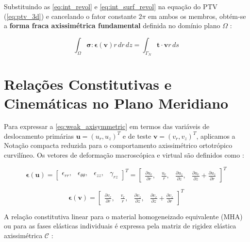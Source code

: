 Substituindo as \eqref{eq:int_revol} e \eqref{eq:int_surf_revol} na equação do PTV (\eqref{eq:ptv_3d}) e cancelando o fator constante $2 \pi$ em ambos os membros, obtém-se a \textbf{forma fraca axissimétrica fundamental} definida no domínio plano $\Omega$ \cite{logg2012automated}:

\begin{equation}
  \int_{\Omega} \mathbf{\sigma} : \mathbf{\epsilon}(\mathbf{v}) r \, d r \, d z = \int_{\Gamma_N} \mathbf{t} \cdot \mathbf{v} r \, d s
  \label{eq:weak_axisymmetric}
\end{equation}

\section{Relações Constitutivas e Cinemáticas no Plano Meridiano}

Para expressar a \eqref{eq:weak_axisymmetric} em termos das variáveis de deslocamento primárias $\mathbf{u} = (u_r, u_z)^T$ e de teste $\mathbf{v} = (v_r, v_z)^T$, aplicamos a Notação compacta reduzida para o comportamento axissimétrico ortotrópico curvilíneo. Os vetores de deformação macroscópica e virtual são definidos como \cite{logg2012automated}:

\begin{equation}
  \mathbf{\epsilon}(\mathbf{u}) = \begin{bmatrix} \epsilon_{rr}, & \epsilon_{\theta\theta}, & \epsilon_{zz}, & \gamma_{rz} \end{bmatrix}^T = \begin{bmatrix} \frac{\partial u_r}{\partial r}, & \frac{u_r}{r}, & \frac{\partial u_z}{\partial z}, & \frac{\partial u_r}{\partial z} + \frac{\partial u_z}{\partial r} \end{bmatrix}^T
  \label{eq:voigt_strain}
\end{equation}

\begin{equation}
  \mathbf{\epsilon}(\mathbf{v}) = \begin{bmatrix} \frac{\partial v_r}{\partial r}, & \frac{v_r}{r}, & \frac{\partial v_z}{\partial z}, & \frac{\partial v_r}{\partial z} + \frac{\partial v_z}{\partial r} \end{bmatrix}^T
  \label{eq:voigt_virtual_strain}
\end{equation}

A relação constitutiva linear para o material homogeneizado equivalente (MHA) ou para as fases elásticas individuais é expressa pela matriz de rigidez elástica axissimétrica $\mathbf{\mathcal{C}}$ \cite{Sadd2009}:

